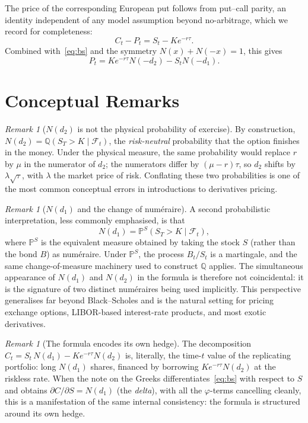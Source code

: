 \documentclass[11pt,a4paper]{article}
\theoremstyle{plain}
\theoremstyle{definition}
\theoremstyle{remark}
\newtheorem{remark}[theorem]{Remark}
\newcommand{\F}{\mathcal{F}}
\newcommand{\Prob}{\mathbb{P}}
\newcommand{\Q}{\mathbb{Q}}
\begin{document}
The price of the corresponding European put follows from put--call
parity, an identity independent of any model assumption beyond
no-arbitrage, which we record for completeness:
\[
    C_t - P_t = S_t - K e^{-r\tau}.
\]
Combined with~\eqref{eq:bs} and the symmetry \(N(x) + N(-x) = 1\), this
gives
\begin{equation}
    P_t = K e^{-r\tau} N(-d_2) - S_t N(-d_1).
    \label{eq:bs-put}
\end{equation}

\section{Conceptual Remarks}

\begin{remark}[\(N(d_2)\) is not the physical probability of exercise]
By construction,
\(N(d_2) = \Q(S_T > K \mid \F_t)\), the \emph{risk-neutral} probability
that the option finishes in the money. Under the physical measure, the
same probability would replace \(r\) by \(\mu\) in the numerator of
\(d_2\); the numerators differ by \((\mu - r)\tau\), so \(d_2\) shifts by
\(\lambda\sqrt{\tau}\), with \(\lambda\) the market price of risk.
Conflating these two probabilities is one of the most
common conceptual errors in introductions to derivatives pricing.
\end{remark}

\begin{remark}[\(N(d_1)\) and the change of num\'{e}raire]
A second probabilistic interpretation, less commonly emphasised, is that
\[
    N(d_1) = \Prob^{S}(S_T > K \mid \F_t),
\]
where \(\Prob^{S}\) is the equivalent measure obtained by taking the
stock \(S\) (rather than the bond \(B\)) as num\'{e}raire. Under
\(\Prob^{S}\), the process \(B_t / S_t\) is a martingale, and the same
change-of-measure machinery used to construct \(\Q\) applies. The
simultaneous appearance of \(N(d_1)\) and \(N(d_2)\) in the formula is
therefore not coincidental: it is the signature of two distinct
num\'{e}raires being used implicitly. This perspective generalises far
beyond Black--Scholes and is the natural setting for pricing exchange
options, LIBOR-based interest-rate products, and most exotic derivatives.
\end{remark}

\begin{remark}[The formula encodes its own hedge]
The decomposition \(C_t = S_t\, N(d_1) - K e^{-r\tau} N(d_2)\) is,
literally, the time-\(t\) value of the replicating portfolio: long
\(N(d_1)\) shares, financed by borrowing \(K e^{-r\tau} N(d_2)\) at the
riskless rate. When the note on the Greeks differentiates~\eqref{eq:bs}
with respect to \(S\) and obtains \(\partial C / \partial S = N(d_1)\)
(the \emph{delta}), with all the \(\varphi\)-terms cancelling cleanly,
this is a manifestation of the same internal consistency: the
formula is structured around its own hedge.
\end{remark}
\end{document}
